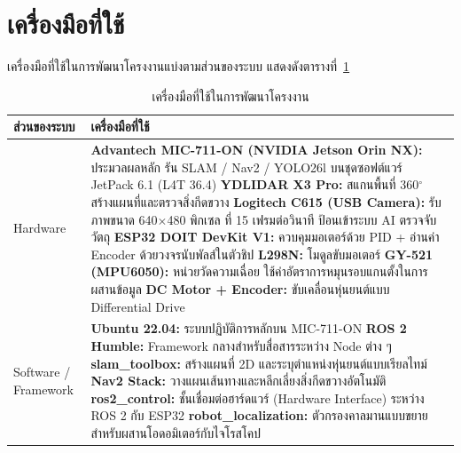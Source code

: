 \documentclass[a4paper,12pt]{report}
\begin{document}
\section{เครื่องมือที่ใช้}

เครื่องมือที่ใช้ในการพัฒนาโครงงานแบ่งตามส่วนของระบบ แสดงดังตารางที่~\ref{tab:tools}

\begin{table}[H]
\centering
\caption[เครื่องมือที่ใช้ในการพัฒนาโครงงาน (บทที่ 1)]{เครื่องมือที่ใช้ในการพัฒนาโครงงาน}
\label{tab:tools}
\small
\begin{tabularx}{\textwidth}{|>{\raggedright\arraybackslash}p{3.2cm}|X|}
\hline
\textbf{ส่วนของระบบ} & \textbf{เครื่องมือที่ใช้} \\
\hline
Hardware &
\textbf{Advantech MIC-711-ON (NVIDIA Jetson Orin NX):} ประมวลผลหลัก
รัน SLAM / Nav2 / YOLO26l บนชุดซอฟต์แวร์ JetPack 6.1 (L4T 36.4) \newline
\textbf{YDLIDAR X3 Pro:} สแกนพื้นที่ 360$^\circ$ สร้างแผนที่และตรวจสิ่งกีดขวาง \newline
\textbf{Logitech C615 (USB Camera):} รับภาพขนาด 640$\times$480 พิกเซล ที่ 15 เฟรมต่อวินาที
ป้อนเข้าระบบ AI ตรวจจับวัตถุ \newline
\textbf{ESP32 DOIT DevKit V1:} ควบคุมมอเตอร์ด้วย PID + อ่านค่า Encoder ด้วยวงจรนับพัลส์ในตัวชิป \newline
\textbf{L298N:} โมดูลขับมอเตอร์ \newline
\textbf{GY-521 (MPU6050):} หน่วยวัดความเฉื่อย ใช้ค่าอัตราการหมุนรอบแกนตั้งในการผสานข้อมูล \newline
\textbf{DC Motor + Encoder:} ขับเคลื่อนหุ่นยนต์แบบ Differential Drive \\
\hline
Software / \newline Framework &
\textbf{Ubuntu 22.04:} ระบบปฏิบัติการหลักบน MIC-711-ON \newline
\textbf{ROS 2 Humble:} Framework กลางสำหรับสื่อสารระหว่าง Node ต่าง ๆ \newline
\textbf{slam\_toolbox:} สร้างแผนที่ 2D และระบุตำแหน่งหุ่นยนต์แบบเรียลไทม์ \newline
\textbf{Nav2 Stack:} วางแผนเส้นทางและหลีกเลี่ยงสิ่งกีดขวางอัตโนมัติ \newline
\textbf{ros2\_control:} ชั้นเชื่อมต่อฮาร์ดแวร์ (Hardware Interface) ระหว่าง ROS 2 กับ ESP32 \newline
\textbf{robot\_localization:} ตัวกรองคาลมานแบบขยายสำหรับผสานโอดอมิเตอร์กับไจโรสโคป \newline

\end{tabularx}
\end{table}
\end{document}
